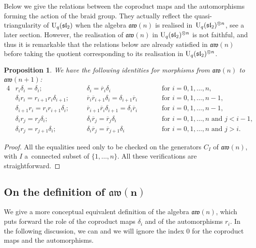 \documentclass[10pt,a4paper]{amsart}
\numberwithin{equation}{section}
\newtheorem{prop}[theo]{Proposition}
\theoremstyle{definition}
\newcommand{\rb}{\overline{r}}
\newcommand{\aw}{\mathfrak{aw}(n)}
\begin{document}
Below we give the relations between the coproduct maps and the automorphisms forming the action of the braid group. They actually reflect the quasi-triangularity of ${\rm U}_q(\mathfrak{sl}_2)$ when the algebra $\aw$ is realised
in~${\rm U}_q(\mathfrak{sl}_2)^{\otimes n}$, see a later section. However, the realisation of $\aw$ in ${\rm U}_q(\mathfrak{sl}_2)^{\otimes n}$ is not faithful, and thus it is remarkable that the relations below are already satisfied in $\aw$
before taking the quotient corresponding to its realisation in ${\rm U}_q(\mathfrak{sl}_2)^{\otimes n}$.
\begin{prop}\label{prop-r-delta}
We have the following identities for morphisms from $\aw$ to $\mathfrak{aw}(n+1)$:
\begin{alignat*}{4}%
&r_i\delta_i=\delta_i; &&\quad \delta_i=\rb_i\delta_i && \quad\text{for $i=0,1,\dots,n$,} &\\
&\delta_ir_i=r_{i+1}r_i\delta_{i+1}; &&\quad \rb_i\rb_{i+1}\delta_i=\delta_{i+1}\rb_i \quad && \quad\text{for $i=0,1,\dots,n-1$,} &\\
&\delta_{i+1}r_i=r_{i}r_{i+1}\delta_{i}; &&\quad \rb_{i+1}\rb_i\delta_{i+1}=\delta_{i}\rb_i && \quad\text{for $i=0,1,\dots,n-1$,} &\\
&\delta_ir_j=r_j\delta_i; &&\quad \delta_i\rb_j=\rb_j\delta_i && \quad\text{for $i=0,1,\dots,n$ and $j<i-1$,} &\\
&\delta_ir_j=r_{j+1}\delta_i; &&\quad \delta_i\rb_j=\rb_{j+1}\delta_i && \quad\text{for $i=0,1,\dots,n$ and $j>i$.} &
\end{alignat*}
\end{prop}
\begin{proof}
All the equalities need only to be checked on the generators $C_I$ of $\aw$, with $I$ a~connected subset of $\{1,\dots,n\}$. All these verifications are straightforward.
\end{proof}

\subsection[On the definition of aw(n)]{On the definition of $\boldsymbol{\aw}$}\label{sect:aw3-n}
We give a more conceptual equivalent definition of the algebra $\aw$, which puts forward the role of the coproduct maps $\delta_i$ and of the automorphisms $r_i$. In the following discussion, we can and we will ignore the index $0$ for the coproduct maps and the automorphisms.
\end{document}
